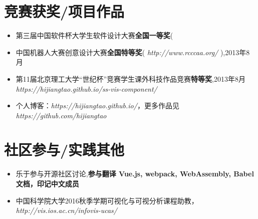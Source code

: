 \documentclass{resume}
\begin{document}
\section{竞赛获奖/项目作品}
\begin{itemize}[parsep=0.2ex]
  \item 第三届中国软件杯大学生软件设计大赛\textbf{全国一等奖}( 
  \item 中国机器人大赛创意设计大赛\textbf{全国特等奖}( \textit{http://www.rcccaa.org/} ),2013年8月
  \item 第11届北京理工大学“世纪杯”竞赛学生课外科技作品竞赛\textbf{特等奖},2013年8月
 \textit{https://hijiangtao.github.io/ss-vis-component/}
  \item 个人博客：\textit{https://hijiangtao.github.io/}，更多作品见 \textit{https://github.com/hijiangtao}
\end{itemize}



\section{社区参与/实践其他}
\begin{itemize}[parsep=0.2ex]
  \item 乐于参与开源社区讨论,\textbf{参与翻译 Vue.js, webpack, WebAssembly, Babel 文档，印记中文成员}
  \item 中国科学院大学2016秋季学期可视化与可视分析课程助教，\textit{http://vis.ios.ac.cn/infovis-ucas/}
\end{itemize}

%
%
\end{document}

